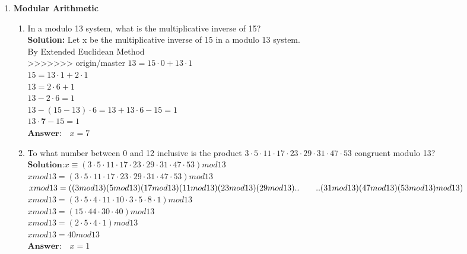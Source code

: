 \documentclass[12pt]{article}
\begin{document}
\begin{enumerate}
\begin{enumerate}
\item {\textbf{Modular Arithmetic}}
\begin{enumerate}
\item {In a modulo 13 system, what is the multiplicative inverse of 15?}\\
\textbf{Solution:} Let \quad x be the multiplicative inverse of 15 in a modulo 13 system.\\
By Extended Euclidean Method\\
>>>>>>> origin/master
$ 13 = 15\cdot0 + 13\cdot1$\\
$ 15 = 13\cdot1 + 2\cdot1$\\
$ 13 = 2\cdot6 + 1$\\
$ 13 - 2\cdot6 = 1$\\
$ 13 - (15 - 13)\cdot6 = 13 + 13\cdot6 - 15 = 1$\\
$ 13\cdot\textbf{7} - 15 = 1$\\
$ \textbf{Answer:} \quad x = 7$

\item {To what number between 0 and 12 inclusive is the product $3\cdot5\cdot11\cdot17\cdot23\cdot29\cdot31\cdot47\cdot53$
congruent modulo 13? }\\
$\textbf{Solution:} x \equiv (3\cdot5\cdot11\cdot17\cdot23\cdot29\cdot31\cdot47\cdot53) mod 13$ \\
$ x mod 13 = (3\cdot5\cdot11\cdot17\cdot23\cdot29\cdot31\cdot47\cdot53) mod 13$\\
$ x mod 13 = ((3 mod 13)(5 mod 13)(17 mod 13)(11 mod 13)(23 mod 13)(29 mod 13)..\\
 \qquad ..(31 mod 13)(47 mod 13)(53 mod 13) mod 13)$\\
$ x mod 13 = (3\cdot5\cdot4\cdot11\cdot10\cdot3\cdot5\cdot8\cdot1)mod13$\\
$ x mod 13 = (15\cdot44\cdot30\cdot40)mod13$\\
$ x mod 13 = (2\cdot5\cdot4\cdot1)mod13$\\
$ x mod 13 = 40mod13$\\
$ \textbf{Answer:} \quad x = 1$


\end{enumerate}
\end{enumerate}
\end{enumerate}
\end{document}
